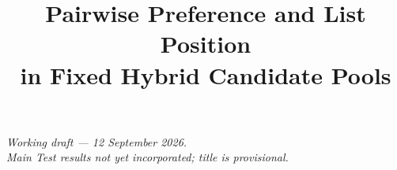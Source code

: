 \documentclass[conference,letterpaper]{IEEEtran}
\title{Pairwise Preference and List Position\\in Fixed Hybrid Candidate Pools}
\author{}
\begin{document}
\maketitle
\begin{center}
\small\textit{Working draft --- 12 September 2026.\\
Main Test results not yet incorporated; title is provisional.}
\end{center}








\end{document}
